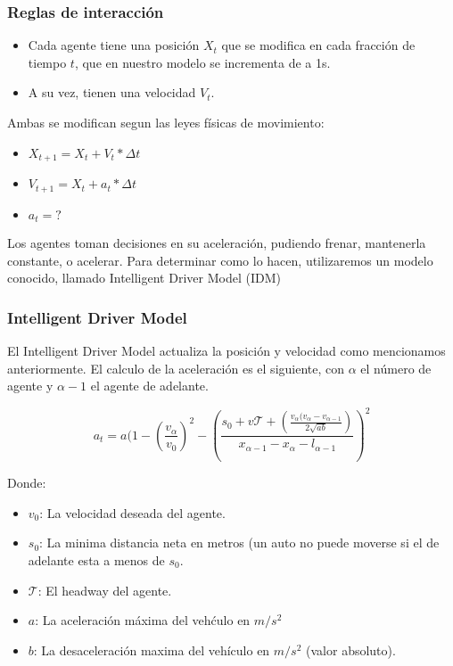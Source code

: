 \documentclass[10pt, compress]{beamer}
\begin{document}
\begin{frame}[fragile]

\frametitle{Reglas de interacci\'on}
\begin{itemize}
\item Cada agente tiene una posici\'on $X_t$ que se modifica en cada fracci\'on de tiempo $t$, que en nuestro modelo se incrementa de a 1s.
\item A su vez, tienen una velocidad $V_t$.
\end{itemize}
Ambas se modifican segun las leyes f\'isicas de movimiento:
\begin{itemize}
\item $X_{t+1} = X_t + V_t * \Delta t$
\item $V_{t+1} = X_t + a_t * \Delta t$
\item $a_t = ?$ 
\end{itemize}

Los agentes toman decisiones en su aceleraci\'on, pudiendo frenar, mantenerla constante, o acelerar. Para determinar como lo hacen, utilizaremos un modelo conocido, llamado Intelligent Driver Model (IDM) \supercite{1}

\end{frame}

\begin{frame}[fragile]

\frametitle{Intelligent Driver Model}
El Intelligent Driver Model actualiza la posici\'on y velocidad como mencionamos anteriormente. El calculo de la aceleraci\'on es el siguiente, con $\alpha$ el n\'umero de agente y $\alpha - 1$ el agente de adelante.

  \begin{equation*}
    a_t = a (1 - (\frac{v_\alpha}{v_0})^2 - (\frac{s_0 + v\mathcal{T} + (\frac{v_\alpha (v_\alpha - v_{\alpha-1}}{2\sqrt{ab}})}{x_{\alpha-1} - x_\alpha - l_{\alpha-1}})^2
  \end{equation*}

Donde:
\begin{itemize}
\item $v_0$: La velocidad deseada del agente.
\item $s_0$: La minima distancia neta en metros (un auto no puede moverse si el de adelante esta a menos de $s_0$.
\item $\mathcal{T}$: El headway del agente.
\item $a$: La aceleraci\'on m\'axima del veh\'culo en $m/s^2$
\item $b$: La desaceleraci\'on maxima del veh\'iculo en $m/s^2$ (valor absoluto).
\end{itemize}

\end{frame}
\end{document}
